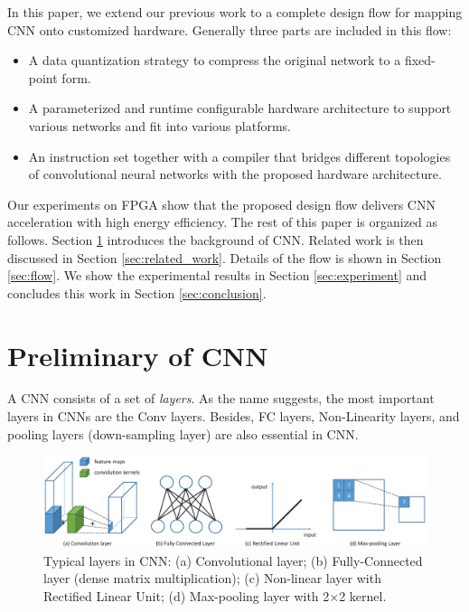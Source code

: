 \documentclass[10pt, conference, compsocconf]{IEEEtran}
\begin{document}
In this paper, we extend our previous work\cite{qiu2016going} to a complete design flow for mapping CNN onto customized hardware. Generally three parts are included in this flow:
\begin{itemize} \itemsep = 0pt
    \item A data quantization strategy to compress the original network to a fixed-point form.
    \item A parameterized and runtime configurable hardware architecture to support various networks and fit into various platforms.
    \item An instruction set together with a compiler that bridges different topologies of convolutional neural networks with the proposed hardware architecture.
\end{itemize}
Our experiments on FPGA show that the proposed design flow delivers CNN acceleration with high energy efficiency. The rest of this paper is organized as follows. Section \ref{sec:prime} introduces the background of CNN. Related work is then discussed in Section \ref{sec:related_work}. Details of the flow is shown in Section \ref{sec:flow}. We show the experimental results in Section \ref{sec:experiment} and concludes this work in Section \ref{sec:conclusion}.



\section{Preliminary of CNN}\label{sec:prime}
A CNN consists of a set of \emph{layers}. As the name suggests, the most important layers in CNNs are the Conv layers. Besides, FC layers, Non-Linearity layers, and pooling layers (down-sampling layer) are also essential in CNN.

\begin{figure}[h]
  \centering
  \includegraphics[width=2\columnwidth]{figure/primer.eps}
  \small
  \caption{Typical layers in CNN: (a) Convolutional layer; (b) Fully-Connected layer (dense matrix multiplication); (c) Non-linear layer with Rectified Linear Unit; (d) Max-pooling layer with 2$\times$2 kernel.}
  \label{fig:primer}
\end{figure}
\end{document}
